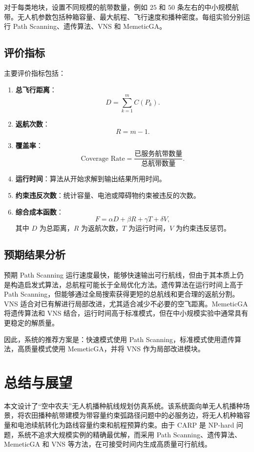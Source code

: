 \documentclass[UTF8,a4paper,12pt]{ctexart}
\begin{document}
对于每类地块，设置不同规模的航带数量，例如 \(25\) 和 \(50\) 条左右的中小规模航带。无人机参数包括种箱容量、最大航程、飞行速度和播种密度。每组实验分别运行 Path Scanning、遗传算法、VNS 和 MemeticGA。

\subsection{评价指标}

主要评价指标包括：

\begin{enumerate}
    \item \textbf{总飞行距离}：
    \[
    D=\sum_{k=1}^{m} C(P_k).
    \]
    \item \textbf{返航次数}：
    \[
    R=m-1.
    \]
    \item \textbf{覆盖率}：
    \[
    \text{Coverage Rate}=\frac{\text{已服务航带数量}}{\text{总航带数量}}.
    \]
    \item \textbf{运行时间}：算法从开始求解到输出结果所用时间。
    \item \textbf{约束违反次数}：统计容量、电池或障碍物约束被违反的次数。
    \item \textbf{综合成本函数}：
    \[
    F=\alpha D+\beta R+\gamma T+\delta V,
    \]
    其中 \(D\) 为总距离，\(R\) 为返航次数，\(T\) 为运行时间，\(V\) 为约束违反惩罚。
\end{enumerate}

\subsection{预期结果分析}

预期 Path Scanning 运行速度最快，能够快速输出可行航线，但由于其本质上仍是构造启发式算法，总航程可能长于全局优化方法。遗传算法在运行时间上高于 Path Scanning，但能够通过全局搜索获得更短的总航线和更合理的返航分割。VNS 适合对已有解进行局部改进，尤其适合减少不必要的空飞距离。MemeticGA 将遗传算法和 VNS 结合，运行时间高于标准模式，但在中小规模实验中通常具有更稳定的解质量。

因此，系统的推荐方案是：快速模式使用 Path Scanning，标准模式使用遗传算法，高质量模式使用 MemeticGA，并将 VNS 作为局部改进模块。

\section{总结与展望}

本文设计了“空中农夫”无人机播种航线规划仿真系统。该系统面向单无人机播种场景，将农田播种航带建模为带容量约束弧路径问题中的必服务边，将无人机种箱容量和电池续航转化为路线容量约束和航程预算约束。由于 CARP 是 NP-hard 问题，系统不追求大规模实例的精确最优解，而采用 Path Scanning、遗传算法、MemeticGA 和 VNS 等方法，在可接受时间内生成高质量可行航线。
\end{document}
